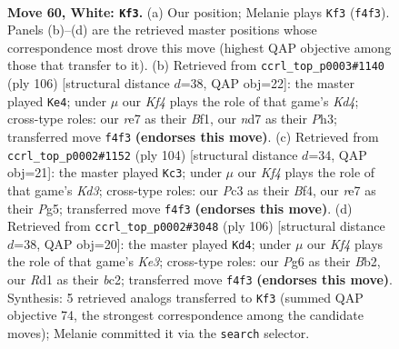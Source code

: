 \documentclass[11pt]{article}
\begin{document}
\clearpage

\begin{figure}[p]\centering
\begin{subfigure}{0.46\textwidth}\centering
\resizebox{\linewidth}{!}{%
\newchessgame
\chessboard[
  setfen={6k1/3nr3/6P1/8/p1p2K2/P1P4p/1BP4P/3R4 w - - 9 60},
  showmover=false,
  pgfstyle=straightmove, color=movearrow, markmove={f4-f3}
]}
\caption{}
\end{subfigure}\hfill
\begin{subfigure}{0.46\textwidth}\centering
\resizebox{\linewidth}{!}{%
\newchessgame
\chessboard[
  setfen={8/2k5/4pp1p/p1P5/P2K1nP1/7P/8/5B2 w - - 5 54},
  showmover=false,
  pgfstyle=straightmove, color=movearrow, markmove={d4-e4}
]}
\caption{}
\end{subfigure}
\\[4pt]
\begin{subfigure}{0.46\textwidth}\centering
\resizebox{\linewidth}{!}{%
\newchessgame
\chessboard[
  setfen={8/1p1n3p/p4Pp1/P2k2P1/5BP1/3K4/8/8 w - - 5 53},
  showmover=false,
  pgfstyle=straightmove, color=movearrow, markmove={d3-c3}
]}
\caption{}
\end{subfigure}\hfill
\begin{subfigure}{0.46\textwidth}\centering
\resizebox{\linewidth}{!}{%
\newchessgame
\chessboard[
  setfen={8/8/p1ppk1p1/P7/1P2P2P/4K3/1Bb4P/8 w - - 29 54},
  showmover=false,
  pgfstyle=straightmove, color=movearrow, markmove={e3-d4}
]}
\caption{}
\end{subfigure}
\caption{\textbf{Move 60, White: \texttt{Kf3}.} (a) Our position; Melanie plays \texttt{Kf3} (\texttt{f4f3}). Panels (b)--(d) are the retrieved master positions whose correspondence most drove this move (highest QAP objective among those that transfer to it). (b) Retrieved from \texttt{ccrl\_top\_p0003\#1140} (ply 106) [structural distance $d$=38, QAP obj=22]: the master played \texttt{Ke4}; under $\mu$ our \emph{Kf4} plays the role of that game's \emph{Kd4}; cross-type roles: our \emph{r}e7 as their \emph{B}f1, our \emph{n}d7 as their \emph{P}h3; transferred move \texttt{f4f3} \textbf{(endorses this move)}. (c) Retrieved from \texttt{ccrl\_top\_p0002\#1152} (ply 104) [structural distance $d$=34, QAP obj=21]: the master played \texttt{Kc3}; under $\mu$ our \emph{Kf4} plays the role of that game's \emph{Kd3}; cross-type roles: our \emph{P}c3 as their \emph{B}f4, our \emph{r}e7 as their \emph{P}g5; transferred move \texttt{f4f3} \textbf{(endorses this move)}. (d) Retrieved from \texttt{ccrl\_top\_p0002\#3048} (ply 106) [structural distance $d$=38, QAP obj=20]: the master played \texttt{Kd4}; under $\mu$ our \emph{Kf4} plays the role of that game's \emph{Ke3}; cross-type roles: our \emph{P}g6 as their \emph{B}b2, our \emph{R}d1 as their \emph{b}c2; transferred move \texttt{f4f3} \textbf{(endorses this move)}. Synthesis: 5 retrieved analogs transferred to \texttt{Kf3} (summed QAP objective 74, the strongest correspondence among the candidate moves); Melanie committed it via the \texttt{search} selector.}
\label{fig:thought-m118}
\end{figure}
\end{document}
